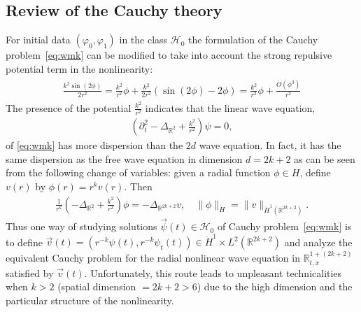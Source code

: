 \documentclass[10pt,reqno]{amsart}
\newcommand{\HH}{\mathcal{H}}
\newcommand{\LL}{\mathcal{L}}
\newcommand{\R}{\mathbb{R}}
\newcommand{\De}{\Delta}
\newcommand{\p}{\partial}
\newcommand{\ant}[1]{\begin{align*}\begin{split} #1 \end{split}\end{align*}}
\newcommand{\EQ}[1]{\begin{equation}\begin{split} #1 \end{split}\end{equation}}
\numberwithin{equation}{section}
\theoremstyle{remark}
\newcommand{\0}{\emptyset}
\begin{document}
\subsection{Review of the Cauchy theory %
} \label{s:2-4}
 For initial data $(\varphi_0, \varphi_1)$ in the class $\HH_0$ the formulation of the Cauchy problem~\eqref{eq:wmk} can be modified to take into account the strong repulsive potential term in the nonlinearity: 
\ant{
\frac{k^2\sin(2\phi)}{2r^2}  = \frac{ k^2}{r^2}\phi + \frac{ k^2}{2r^2} (\sin(2\phi) - 2\phi)  =  \frac{k^2}{r^2} \phi + \frac{O(\phi^3)}{r^2} 
} 
The presence of the potential $\frac{k^2}{r^2}$ indicates that the linear wave equation, 
\EQ{ \label{eq:2dlin} 
( \p_t^2 - \Delta_{\R^2} + \frac{k^2}{r^2} ) \psi = 0
,%
}
of \eqref{eq:wmk} has more dispersion than the $2d$ wave equation. In fact, it has the same dispersion as the free wave equation in dimension $d = 2k+2$
as can be seen from the following change of variables:  given a radial function $\phi \in H$, define $v(r)$ by  $\phi(r) = r^k v(r)$. Then 
\EQ{ \label{eq:free} 
\frac{1}{r^k}(- \Delta_{\R^2} + \frac{k^2}{r^2}) \phi = -\De_{\R^{2k+2}} v, \quad \| \phi \|_{H}  = \|v \|_{\dot{H}^1(\R^{2k+2})}. 
}
Thus one way of studying solutions $\vec \psi(t) \in \HH_0$ of  Cauchy problem~\eqref{eq:wmk} is to define $\vec v(t)  = (r^{-k} \psi(t), r^{-k} \psi_t(t)) \in \dot H^1 \times L^2 (\R^{2k+2})$ and analyze the equivalent Cauchy problem for the radial nonlinear wave equation in $\R^{1+ (2k+2)}_{t, x}$ satisfied by $\vec v(t)$. Unfortunately, this route leads to unpleasant technicalities when $k >2$ (spatial dimension $=2k+2>6$) due to the high dimension and the particular structure of the nonlinearity.%
\end{document}
